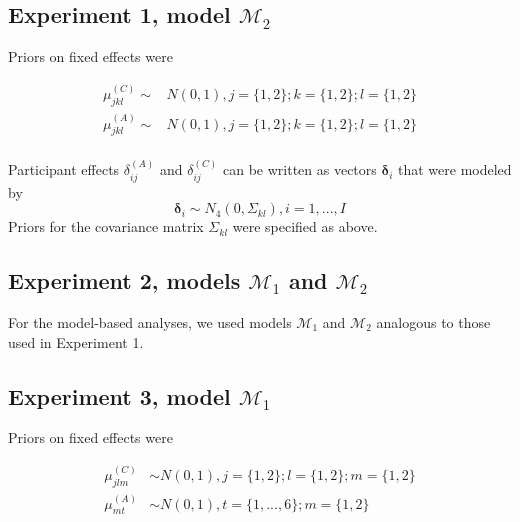 \documentclass[floatsintext,man]{apa6}
\begin{document}
\begin{appendix}
  \subsection{\texorpdfstring{Experiment 1, model
  \(\mathcal{M}_2\)}{Experiment 1, model \textbackslash{}mathcal\{M\}\_2}}\label{experiment-1-model-mathcalmux5f2}
  
  Priors on fixed effects were
  
  \[
  \begin{aligned}
  \mu_{jkl}^{(C)} \sim & N(0, 1), j = \lbrace 1, 2 \rbrace; k = \lbrace 1, 2 \rbrace; l = \lbrace 1, 2 \rbrace\\
  \mu_{jkl}^{(A)} \sim & N(0, 1), j = \lbrace 1, 2 \rbrace; k = \lbrace 1, 2 \rbrace; l = \lbrace 1, 2 \rbrace\\
  \end{aligned}
  \]
  
  Participant effects \(\delta_{ij}^{(A)}\) and \(\delta_{ij}^{(C)}\) can
  be written as vectors \(\boldsymbol{\delta}_i\) that were modeled by \[
  \boldsymbol{\delta}_i \sim N_4 (0, \Sigma_{kl}), i = 1, ..., I
  \] Priors for the covariance matrix \(\Sigma_{kl}\) were specified as
  above.
  
  \subsection{\texorpdfstring{Experiment 2, models \(\mathcal{M}_1\) and
  \(\mathcal{M}_2\)}{Experiment 2, models \textbackslash{}mathcal\{M\}\_1 and \textbackslash{}mathcal\{M\}\_2}}\label{experiment-2-models-mathcalmux5f1-and-mathcalmux5f2}
  
  For the model-based analyses, we used models \(\mathcal{M}_1\) and
  \(\mathcal{M}_2\) analogous to those used in Experiment 1.
  
  \subsection{\texorpdfstring{Experiment 3, model
  \(\mathcal{M}_1\)}{Experiment 3, model \textbackslash{}mathcal\{M\}\_1}}\label{experiment-3-model-mathcalmux5f1}
  
  Priors on fixed effects were
  
  \[
  \begin{aligned}
  \mu_{jlm}^{(C)} & \sim N(0, 1), j = \lbrace 1, 2 \rbrace; l = \lbrace 1, 2 \rbrace; m = \lbrace 1, 2 \rbrace\\
  \mu_{mt}^{(A)} & \sim N(0, 1), t = \lbrace 1, ..., 6 \rbrace ; m = \lbrace 1, 2 \rbrace\\
  \end{aligned}
  \]
  

\end{appendix}
\end{document}
